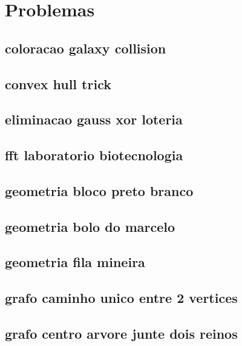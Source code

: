 \section{Problemas}
\subsection{coloracao galaxy collision}
\raggedbottom
\clearpage
\subsection{convex hull trick}
\raggedbottom
\clearpage
\subsection{eliminacao gauss xor loteria}
\raggedbottom
\clearpage
\subsection{fft laboratorio biotecnologia}
\raggedbottom
\clearpage
\subsection{geometria bloco preto branco}
\raggedbottom
\clearpage
\subsection{geometria bolo do marcelo}
\raggedbottom
\clearpage
\subsection{geometria fila mineira}
\raggedbottom
\clearpage
\subsection{grafo caminho unico entre 2 vertices}
\raggedbottom
\clearpage
\subsection{grafo centro arvore junte dois reinos}
\raggedbottom
\clearpage
